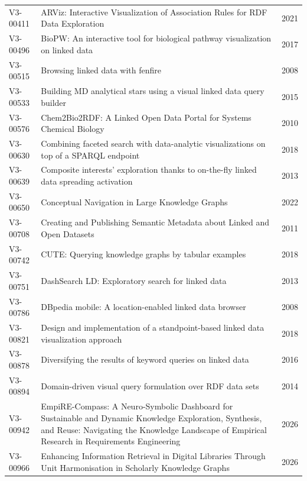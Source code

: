 \documentclass[manuscript,review,screen]{acmart}
\begin{document}
\begin{longtable}{@{}L{21mm}L{107mm}L{17mm}@{}}
V3-00411 & ARViz: Interactive Visualization of Association Rules for RDF Data Exploration & 2021 \citep{V3-00411}\\
V3-00496 & BioPW: An interactive tool for biological pathway visualization on linked data & 2017 \citep{V3-00496}\\
V3-00515 & Browsing linked data with fenfire & 2008 \citep{V3-00515}\\
V3-00533 & Building MD analytical stars using a visual linked data query builder & 2015 \citep{V3-00533}\\
V3-00576 & Chem2Bio2RDF: A Linked Open Data Portal for Systems Chemical Biology & 2010 \citep{V3-00576}\\
V3-00630 & Combining faceted search with data-analytic visualizations on top of a SPARQL endpoint & 2018 \citep{V3-00630}\\
V3-00639 & Composite interests' exploration thanks to on-the-fly linked data spreading activation & 2013 \citep{V3-00639}\\
V3-00650 & Conceptual Navigation in Large Knowledge Graphs & 2022 \citep{V3-00650}\\
V3-00708 & Creating and Publishing Semantic Metadata about Linked and Open Datasets & 2011 \citep{V3-00708}\\
V3-00742 & CUTE: Querying knowledge graphs by tabular examples & 2018 \citep{V3-00742}\\
V3-00751 & DashSearch LD: Exploratory search for linked data & 2013 \citep{V3-00751}\\
V3-00786 & DBpedia mobile: A location-enabled linked data browser & 2008 \citep{V3-00786}\\
V3-00821 & Design and implementation of a standpoint-based linked data visualization approach & 2018 \citep{V3-00821}\\
V3-00878 & Diversifying the results of keyword queries on linked data & 2016 \citep{V3-00878}\\
V3-00894 & Domain-driven visual query formulation over RDF data sets & 2014 \citep{V3-00894}\\
V3-00942 & EmpiRE-Compass: A Neuro-Symbolic Dashboard for Sustainable and Dynamic Knowledge Exploration, Synthesis, and Reuse: Navigating the Knowledge Landscape of Empirical Research in Requirements Engineering & 2026 \citep{V3-00942}\\
V3-00966 & Enhancing Information Retrieval in Digital Libraries Through Unit Harmonisation in Scholarly Knowledge Graphs & 2026 \citep{V3-00966}\\

\end{longtable}
\end{document}
